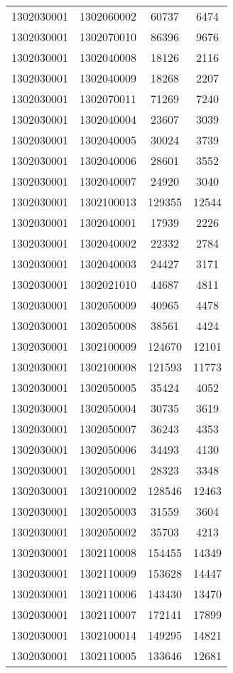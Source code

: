 \begin{longtable}{llcc}
1302030001 & 1302060002 & 60737 & 6474\\
1302030001 & 1302070010 & 86396 & 9676\\
1302030001 & 1302040008 & 18126 & 2116\\
1302030001 & 1302040009 & 18268 & 2207\\
1302030001 & 1302070011 & 71269 & 7240\\
1302030001 & 1302040004 & 23607 & 3039\\
1302030001 & 1302040005 & 30024 & 3739\\
1302030001 & 1302040006 & 28601 & 3552\\
1302030001 & 1302040007 & 24920 & 3040\\
1302030001 & 1302100013 & 129355 & 12544\\
1302030001 & 1302040001 & 17939 & 2226\\
1302030001 & 1302040002 & 22332 & 2784\\
1302030001 & 1302040003 & 24427 & 3171\\
1302030001 & 1302021010 & 44687 & 4811\\
1302030001 & 1302050009 & 40965 & 4478\\
1302030001 & 1302050008 & 38561 & 4424\\
1302030001 & 1302100009 & 124670 & 12101\\
1302030001 & 1302100008 & 121593 & 11773\\
1302030001 & 1302050005 & 35424 & 4052\\
1302030001 & 1302050004 & 30735 & 3619\\
1302030001 & 1302050007 & 36243 & 4353\\
1302030001 & 1302050006 & 34493 & 4130\\
1302030001 & 1302050001 & 28323 & 3348\\
1302030001 & 1302100002 & 128546 & 12463\\
1302030001 & 1302050003 & 31559 & 3604\\
1302030001 & 1302050002 & 35703 & 4213\\
1302030001 & 1302110008 & 154455 & 14349\\
1302030001 & 1302110009 & 153628 & 14447\\
1302030001 & 1302110006 & 143430 & 13470\\
1302030001 & 1302110007 & 172141 & 17899\\
1302030001 & 1302100014 & 149295 & 14821\\
1302030001 & 1302110005 & 133646 & 12681\\

\end{longtable}
